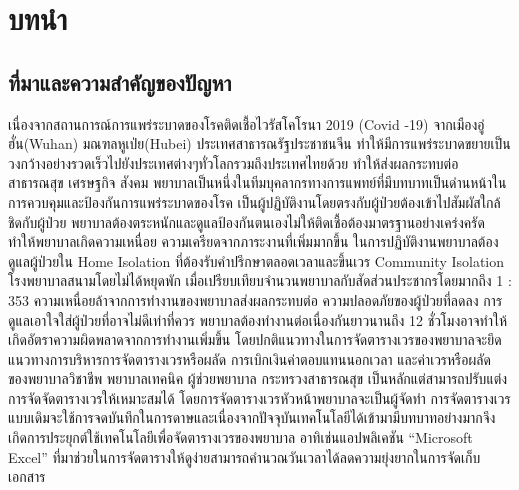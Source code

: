 \setcounter{secnumdepth}{4}
\baselineskip=8mm
\chapter{บทนำ}

\renewcommand{\thesubsection}{\arabic{subsection}.}
\renewcommand{\theequation}{\thesection\arabic{equation}}
\renewcommand{\thesubsubsection}{\thesubsection\arabic{subsubsection}}
\renewcommand{\thesection}{}
\renewcommand{\paragraph}{}
\section{ที่มาและความสำคัญของปัญหา}

เนื่องจากสถานการณ์การแพร่ระบาดของโรคติดเชื้อไวรัสโคโรนา 2019 (Covid -19) จากเมืองอู่ฮั่น(Wuhan) มณฑลหูเป่ย(Hubei) ประเทศสาธารณรัฐประชาชนจีน ทำให้มีการแพร่ระบาดขยายเป็นวงกว้างอย่างรวดเร็วไปยังประเทศต่างๆทั่วโลกรวมถึงประเทศไทยด้วย ทำให้ส่งผลกระทบต่อสาธารณสุข เศรษฐกิจ สังคม \cite{wuhan:hupei}
พยาบาลเป็นหนึ่งในทีมบุคลากรทางการแพทย์ที่มีบทบาทเป็นด่านหน้าในการควบคุมและป้องกันการแพร่ระบาดของโรค เป็นผู้ปฏิบัติงานโดยตรงกับผู้ป่วยต้องเข้าไปสัมผัสใกล้ชิดกับผู้ป่วย พยาบาลต้องตระหนักและดูแลป้องกันตนเองไม่ให้ติดเชื้อต้องมาตรฐานอย่างเคร่งครัด \cite{nurse:covid}
ทำให้พยาบาลเกิดความเหนื่อย ความเครียดจากภาระงานที่เพิ่มมากขึ้น ในการปฏิบัติงานพยาบาลต้องดูแลผู้ป่วยใน Home Isolation ที่ต้องรับคำปรึกษาตลอดเวลาและขึ้นเวร Community Isolation โรงพยาบาลสนามโดยไม่ได้หยุดพัก \cite{nurse:Isolation}
เมื่อเปรียบเทียบจำนวนพยาบาลกับสัดส่วนประชากรโดยมากถึง 1 : 353 \cite{people:nurse} ความเหนื่อยล้าจากการทํางานของพยาบาลส่งผลกระทบต่อ ความปลอดภัยของผู้ป่วยที่ลดลง การดูแลเอาใจใส่ผู้ป่วยที่อาจไม่ดีเท่าที่ควร พยาบาลต้องทํางานต่อเนื่องกันยาวนานถึง 12 ชั่วโมงอาจทําให้เกิดอัตราความผิดพลาดจากการทํางานเพิ่มขึ้น \cite{ngeaun:nurse}
โดยปกติแนวทางในการจัดตารางเวรของพยาบาลจะยึด แนวทางการบริหารการจัดตารางเวรหรือผลัด การเบิกเงินค่าตอบแทนนอกเวลา และค่าเวรหรือผลัด ของพยาบาลวิชาชีพ พยาบาลเทคนิค ผู้ช่วยพยาบาล กระทรวงสาธารณสุข เป็นหลักแต่สามารถปรับแต่งการจัดจัดตารางเวรให้เหมาะสมได้ \cite{tarang:nurse}
โดยการจัดตารางเวรหัวหน้าพยาบาลจะเป็นผู้จัดทำ การจัดตารางเวรแบบเดิมจะใช้การจดบันทึกในการดาษและเนื่องจากปัจจุบันเทคโนโลยีได้เข้ามามีบทบาทอย่างมากจึงเกิดการประยุกต์ใช้เทคโนโลยีเพื่อจัดตารางเวรของพยาบาล อาทิเช่นแอปพลิเคชัน “Microsoft Excel” ที่มาช่วยในการจัดตารางให้ดูง่ายสามารถคำนวณวันเวลาได้ลดความยุ่งยากในการจัดเก็บเอกสาร \cite{excel:headnurse}

